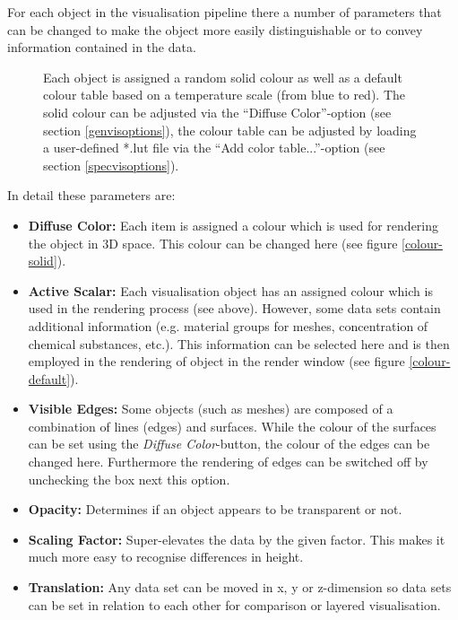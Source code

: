 For each object in the visualisation pipeline there a number of parameters that can be changed to make the object more easily distinguishable or to convey information contained in the data.

\begin{figure}[tb]
\begin{center}
\enspace
{}\enspace
{}
\end{center}
\caption{Each object is assigned a random solid colour as well as a default colour table based on a temperature scale (from blue to red). The solid colour can be adjusted via the ``Diffuse Color''-option (see section \ref{genvisoptions}), the colour table can be adjusted by loading a user-defined *.lut file via the ``Add color table...''-option (see section \ref{specvisoptions}).} \label{fig:colours}
\end{figure}

In detail these parameters are:

\begin{itemize}
\item \textbf{Diffuse Color:} Each item is assigned a colour which is used for rendering the object in 3D space. This colour can be changed here (see figure \ref{colour-solid}).
\item \textbf{Active Scalar:} Each visualisation object has an assigned colour which is used in the rendering process (see above). However, some data sets contain additional information (e.g. material groups for meshes, concentration of chemical substances, etc.). This information can be selected here and is then employed in the rendering of object in the render window (see figure \ref{colour-default}).
\item \textbf{Visible Edges:} Some objects (such as meshes) are composed of a combination of lines (edges) and surfaces. While the colour of the surfaces can be set using the \emph{Diffuse Color}-button, the colour of the edges can be changed here. Furthermore the rendering of edges can be switched off by unchecking the box next this option.
\item \textbf{Opacity:} Determines if an object appears to be transparent or not.
\item \textbf{Scaling Factor:} Super-elevates the data by the given factor. This makes it much more easy to recognise differences in height.
\item \textbf{Translation:} Any data set can be moved in x, y or z-dimension so data sets can be set in relation to each other for comparison or layered visualisation.
\end{itemize}

